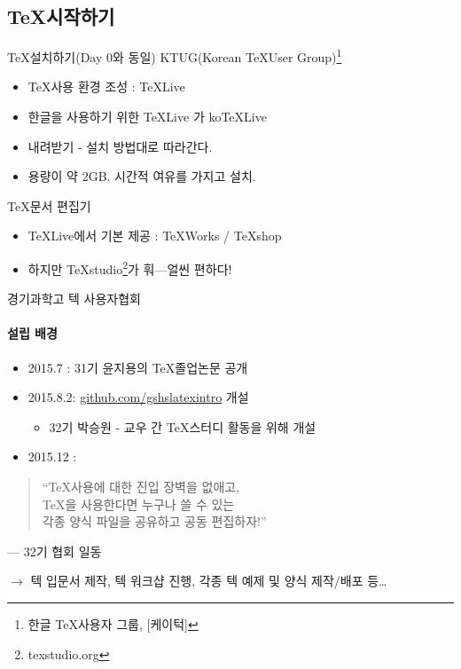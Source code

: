 \documentclass[12pt]{beamer}
\begin{document}
\subsection{\TeX 시작하기}
\begin{frame}{\TeX 설치하기{\normalsize (Day 0와 동일)}}
	KTUG(Korean \TeX User Group)\footnote{한글 \TeX 사용자 그룹, [케이턱]}
	\begin{itemize}
		\item \TeX 사용 환경 조성 : TeXLive
		\item 한글을 사용하기 위한 TeXLive 가 koTeXLive
		\item 내려받기 - 설치 방법대로 따라간다.
		\item 용량이 약 2GB. 시간적 여유를 가지고 설치.
	\end{itemize}
	\TeX 문서 편집기
	\begin{itemize}
		\item TeXLive에서 기본 제공 : TeXWorks / TeXshop
		\item 하지만 TeXstudio\footnote{texstudio.org}가 훠---얼씬 
		편하다!
	\end{itemize}
\end{frame}
\begin{frame}{경기과학고 텍 사용자협회}
	\framesubtitle{설립 배경}
	\begin{itemize}
		\item 2015.7 : 31기 윤지용의 \TeX 졸업논문 공개
		\item 2015.8.2: \url{github.com/gshslatexintro} 개설
		\begin{itemize}
			\item 32기 박승원 - 교우 간 \TeX 스터디 활동을 위해 개설
		\end{itemize}
		\item 2015.12 :
	\end{itemize}
	\begin{quote}
		``\TeX 사용에 대한 진입 장벽을 없애고, \\
		\TeX 을 사용한다면 누구나 쓸 수 있는 \\
		각종 양식 파일을 공유하고 공동 편집하자!''
	\end{quote}
	\vspace{-.5cm}
	\begin{flushright}
		--- 32기 협회 일동
	\end{flushright}
	$ \rightarrow $ 텍 입문서 제작, 텍 워크샵 진행, 각종 텍 예제 및 양식 제작/배포 등\ldots
\end{frame}
\end{document}
